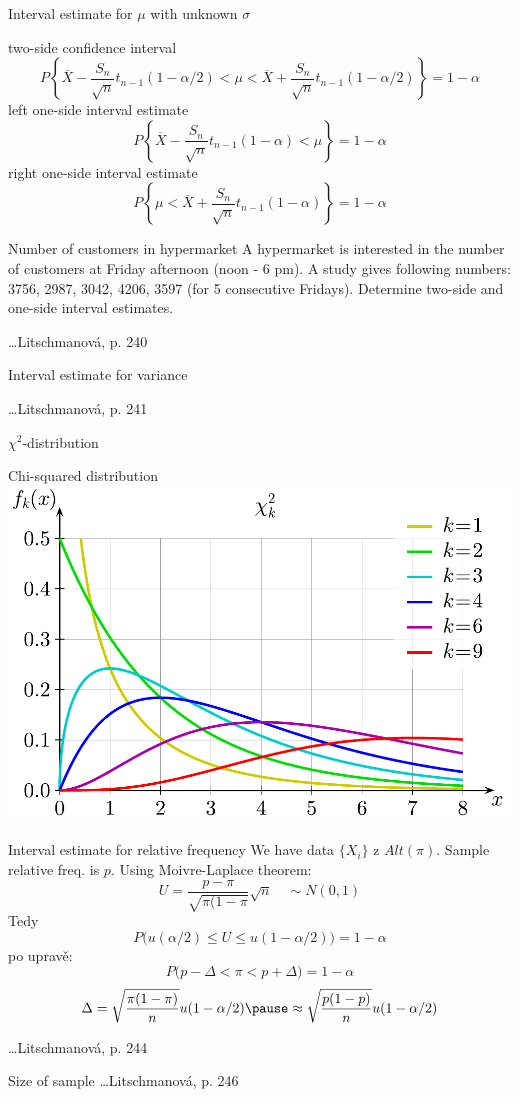 \documentclass[smaller]{beamer}
\def\ol#1{\overline{#1}}
\def\blue#1{{\usebeamercolor[fg]{my blue} #1}}
\def\xskip{{\vspace{2ex}}}
\begin{document}
\begin{frame}{Interval estimate for $\mu$ with unknown $\sigma$}

two-side confidence interval
\[
 P\left\{ \ol{X} - \frac{S_n}{\sqrt{n}}t_{n-1}(1-\alpha/2) < \mu < \ol{X} + \frac{S_n}{\sqrt{n}}t_{n-1}(1-\alpha/2) \right\} = 1-\alpha
\]
left one-side interval estimate
\[
 P\left\{ \ol{X} - \frac{S_n}{\sqrt{n}}t_{n-1}(1-\alpha) < \mu \right\} = 1-\alpha
\]
right one-side interval estimate
\[
 P\left\{ \mu < \ol{X} + \frac{S_n}{\sqrt{n}}t_{n-1}(1-\alpha) \right\} = 1-\alpha
\]
    
\end{frame}
  
  
\begin{frame}{Number of customers in hypermarket}
A hypermarket is interested in the number of customers at Friday afternoon (noon - 6 pm). 
A study gives following numbers: 3756, 2987, 3042, 4206, 3597 (for 5 consecutive Fridays).
Determine two-side and one-side interval estimates.

\xskip
\dots Litschmanová, p. 240
\end{frame}


\begin{frame}{Interval estimate for variance}
  
\dots Litschmanová, p. 241  

\xskip
\blue{$\chi^2$-distribution}
\end{frame}
  
\begin{frame}{Chi-squared distribution}
 \includegraphics[scale=0.5]{07_Chi-square.pdf}
\end{frame}

  
\begin{frame}{Interval estimate for relative frequency}
We have data $\{X_i\}$ z $Alt(\pi)$. Sample relative freq. is $p$.
Using Moivre-Laplace theorem:
\[
U = \frac{p - \pi}{\sqrt{\pi(1-\pi}}\sqrt{n} \quad \sim N(0,1)
\]
Tedy 
\[
 P\big(u(\alpha/2) \le U \le u(1-\alpha/2)\big) = 1-\alpha
\]
po upravě:
\[
 P\big(p-\Delta < \pi < p+\Delta) = 1-\alpha
\]
\[
 \Delta = \sqrt{\frac{\pi(1-\pi)}{n}}u(1-\alpha/2) \pause \approx \sqrt{\frac{p(1-p)}{n}}u(1-\alpha/2)
\]

\dots Litschmanová, p. 244
\end{frame}
  
  
\begin{frame}{Size of sample}
\dots  Litschmanová, p. 246
\end{frame}
  
\end{document}
